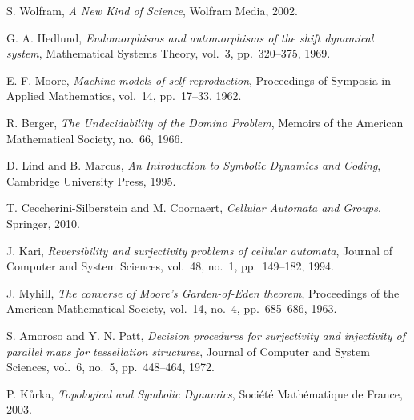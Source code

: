 \documentclass[11pt]{article}
\theoremstyle{definition}
\theoremstyle{remark}
\begin{document}
\begin{thebibliography}{99}

S. Wolfram,
\textit{A New Kind of Science},
Wolfram Media, 2002.

G. A. Hedlund,
\textit{Endomorphisms and automorphisms of the shift dynamical system},
Mathematical Systems Theory, vol.~3, pp.~320--375, 1969.

E. F. Moore,
\textit{Machine models of self-reproduction},
Proceedings of Symposia in Applied Mathematics, vol.~14, pp.~17--33, 1962.

R. Berger,
\textit{The Undecidability of the Domino Problem},
Memoirs of the American Mathematical Society, no.~66, 1966.

D. Lind and B. Marcus,
\textit{An Introduction to Symbolic Dynamics and Coding},
Cambridge University Press, 1995.

T. Ceccherini-Silberstein and M. Coornaert,
\textit{Cellular Automata and Groups},
Springer, 2010.

J. Kari,
\textit{Reversibility and surjectivity problems of cellular automata},
Journal of Computer and System Sciences, vol.~48, no.~1, pp.~149--182, 1994.

J. Myhill,
\textit{The converse of Moore's Garden-of-Eden theorem},
Proceedings of the American Mathematical Society, vol.~14, no.~4, pp.~685--686, 1963.

S. Amoroso and Y. N. Patt,
\textit{Decision procedures for surjectivity and injectivity of parallel maps for tessellation structures},
Journal of Computer and System Sciences, vol.~6, no.~5, pp.~448--464, 1972.

P. Kůrka,
\textit{Topological and Symbolic Dynamics},
Société Mathématique de France, 2003.

\end{thebibliography}
\end{document}
